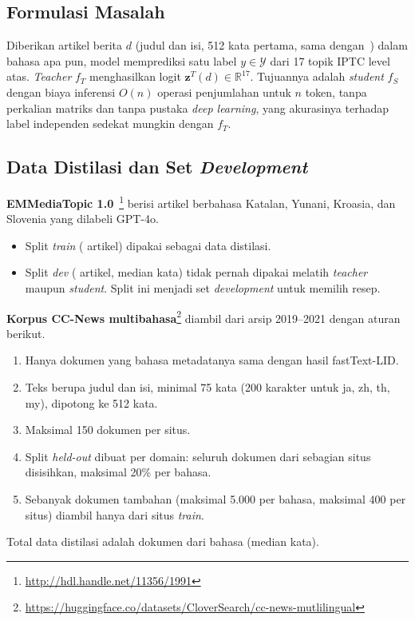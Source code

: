 \documentclass[journal]{IEEEtran}
\newcommand{\eng}[1]{\textit{#1}}   %
\begin{document}
\subsection{Formulasi Masalah}
Diberikan artikel berita $d$ (judul dan isi, 512 kata pertama, sama dengan~\cite{kuzman2025llm}) dalam bahasa apa pun, model memprediksi satu label $y\in\mathcal{Y}$ dari 17 topik IPTC level atas. \eng{Teacher} $f_T$ menghasilkan logit $\mathbf{z}^T(d)\in\mathbb{R}^{17}$. Tujuannya adalah \eng{student} $f_S$ dengan biaya inferensi $O(n)$ operasi penjumlahan untuk $n$ token, tanpa perkalian matriks dan tanpa pustaka \eng{deep learning}, yang akurasinya terhadap label independen sedekat mungkin dengan $f_T$.

\subsection{Data Distilasi dan Set \eng{Development}}
\textbf{EMMediaTopic 1.0}~\cite{kuzman2025llm}\footnote{\url{http://hdl.handle.net/11356/1991}} berisi artikel berbahasa Katalan, Yunani, Kroasia, dan Slovenia yang dilabeli GPT-4o.
\begin{itemize}
  \item Split \eng{train} ( artikel) dipakai sebagai data distilasi.
  \item Split \eng{dev} ( artikel, median  kata) tidak pernah dipakai melatih \eng{teacher} maupun \eng{student}. Split ini menjadi set \eng{development} untuk memilih resep.
\end{itemize}

\textbf{Korpus CC-News multibahasa}\footnote{\url{https://huggingface.co/datasets/CloverSearch/cc-news-mutlilingual}} diambil dari arsip 2019--2021 dengan aturan berikut.
\begin{enumerate}
  \item Hanya dokumen yang bahasa metadatanya sama dengan hasil fastText-LID.
  \item Teks berupa judul dan isi, minimal 75 kata (200 karakter untuk ja, zh, th, my), dipotong ke 512 kata.
  \item Maksimal 150 dokumen per situs.
  \item Split \eng{held-out} dibuat per domain: seluruh dokumen dari sebagian situs disisihkan, maksimal 20\% per bahasa.
  \item Sebanyak  dokumen tambahan (maksimal 5.000 per bahasa, maksimal 400 per situs) diambil hanya dari situs \eng{train}.
\end{enumerate}
Total data distilasi adalah  dokumen dari  bahasa (median  kata).
\end{document}
